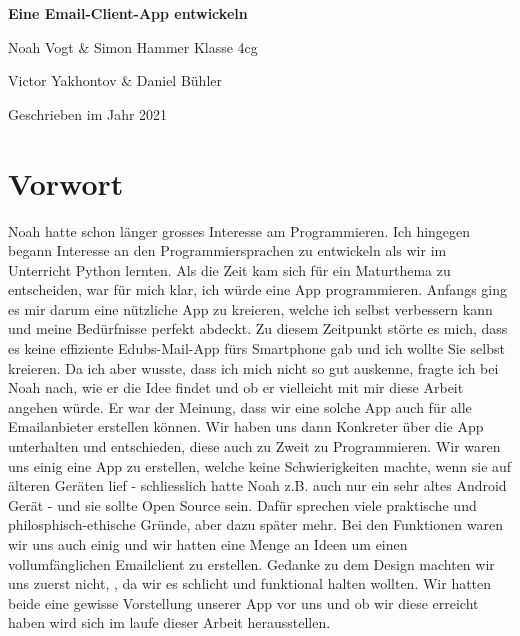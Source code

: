 \documentclass[a4paper,11pt]{article}
\begin{document}
\begin{titlepage}

\vspace*{1cm}
	\centering
	
	{\huge\bfseries Eine Email-Client-App entwickeln \par}
	\vspace{0.5cm}
	{\Large Noah Vogt \& Simon Hammer Klasse 4cg\par}
    \vspace{0.5cm}
    {\Large Victor Yakhontov \& Daniel Bühler \par }
	\vspace{17cm}

	{\large Geschrieben im Jahr 2021\par}
	
\end{titlepage}

\tableofcontents
\pagebreak

\section{Vorwort}
Noah hatte schon länger grosses Interesse am Programmieren. Ich hingegen begann Interesse an den Programmiersprachen zu entwickeln als wir im Unterricht 
Python lernten. Als die Zeit kam sich für ein Maturthema zu entscheiden, war für mich klar, ich würde eine App programmieren. Anfangs ging es mir darum eine 
nützliche App zu kreieren, welche ich selbst verbessern kann und meine Bedürfnisse perfekt abdeckt.
Zu diesem Zeitpunkt störte es mich, dass es keine effiziente Edubs-Mail-App fürs Smartphone gab und ich wollte Sie selbst kreieren. 
Da ich aber wusste, dass ich mich nicht so gut auskenne, fragte ich bei Noah nach, wie er die Idee findet und ob er vielleicht mit mir diese Arbeit 
angehen würde. Er war der Meinung, dass wir eine solche App auch für alle Emailanbieter erstellen können. Wir haben uns dann Konkreter über die App unterhalten und entschieden, diese auch zu Zweit 
zu Programmieren. Wir waren uns einig eine App zu erstellen, welche keine Schwierigkeiten machte, wenn sie auf älteren Geräten lief - schliesslich hatte Noah z.B. auch nur ein sehr altes Android Gerät - und sie sollte Open Source sein. Dafür sprechen viele praktische und philosphisch-ethische Gründe, aber dazu später mehr.
Bei den Funktionen waren wir uns auch einig und wir hatten eine Menge an Ideen um einen vollumfänglichen Emailclient zu erstellen. Gedanke zu dem Design machten wir uns zuerst nicht,
, da wir es schlicht und funktional halten wollten. 
Wir hatten beide eine gewisse Vorstellung unserer App vor uns und ob wir diese erreicht haben wird sich im laufe dieser Arbeit herausstellen. 
\end{document}
